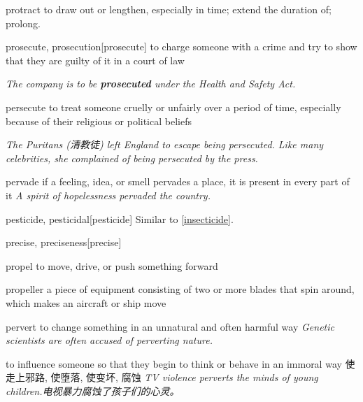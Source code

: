 \begin{DefWord}{protract}
    to draw out or lengthen, especially in time; extend the duration of; prolong.
\end{DefWord}

\begin{DefWord}{prosecute, prosecution}[prosecute]
    to charge someone with a crime and try to show that they are guilty of it in a court of law

    \textit{The company is to be \textbf{prosecuted} under the Health and Safety Act.}
\end{DefWord}

\begin{DefWord}{persecute}
    to treat someone cruelly or unfairly over a period of time, especially because of their religious or political beliefs

    \textit{The Puritans (清教徒) left England to escape being persecuted. Like many celebrities, she complained of being persecuted by the press.}
\end{DefWord}

\begin{DefWord}{pervade}
    if a feeling, idea, or smell pervades a place, it is present in every part of it
    \textit{A spirit of hopelessness pervaded the country.}
\end{DefWord}

\begin{DefWord}{pesticide, pesticidal}[pesticide]
    Similar to \ref{insecticide}.
\end{DefWord}


\begin{DefWord}{precise, preciseness}[precise]
\end{DefWord}

\begin{DefWord}{propel}
    to move, drive, or push something forward
\end{DefWord}


\begin{DefWord}{propeller}
    a piece of equipment consisting of two or more blades that spin around, which makes an aircraft or ship move
\end{DefWord}

\begin{DefWord}{pervert}
    to change something in an unnatural and often harmful way
    \textit{Genetic scientists are often accused of perverting nature.}

    to influence someone so that they begin to think or behave in an immoral way 使走上邪路, 使堕落, 使变坏, 腐蚀
    \textit{TV violence perverts the minds of young children.电视暴力腐蚀了孩子们的心灵。 }
\end{DefWord}


